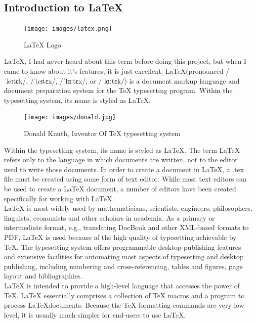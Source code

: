 \subsection{Introduction to \LaTeX}
\begin{figure}[ht]
\centering
\texttt{[image: images/latex.png]}
\caption{\LaTeX{} Logo}
\end{figure}
\hspace{-1.8em} \LaTeX{}, I had never heard about this term before doing this project,
but when I came to know about it's features, it is just excellent. 
\LaTeX (pronounced /ˈleɪtɛk/, /ˈleɪtɛx/, /ˈlɑːtɛx/, or /ˈlɑːtɛk/) is a 
document markup language and document preparation system for the \TeX{} 
typesetting  program. Within the typesetting system, its name is styled 
as \LaTeX.
\begin{figure}[ht]
\centering
\texttt{[image: images/donald.jpg]}
\caption{Donald Knuth, Inventor Of \TeX{} typesetting system}
\end{figure}

\hspace{-1.8em} Within the typesetting system, its name is styled as \LaTeX. The term 
\LaTeX{} refers only to the language in which documents are written, 
not to the editor used to write those documents. In order to create a 
document in \LaTeX, a .tex file must be created using some form of text 
editor. While most text editors can be used to create a \LaTeX{} document, 
a number of editors have been created specifically for working with \LaTeX.\\

\noindent\LaTeX{} is most widely used by mathematicians, scientists, 
engineers, philosophers, linguists, economists and other scholars in 
academia. As a primary or intermediate format, e.g., translating DocBook 
and other XML-based formats to PDF, \LaTeX{} is used because of the 
high quality of typesetting achievable by \TeX. The typesetting system 
offers programmable desktop publishing features and extensive facilities 
for automating most aspects of typesetting and desktop publishing, 
including numbering and cross-referencing, tables and figures, 
page layout and bibliographies.\\

\noindent\LaTeX{} is intended to provide a high-level language that
accesses the power of \TeX. \LaTeX{} essentially comprises a
collection of \TeX{} macros and a program to process \LaTeX documents. 
Because the \TeX{} formatting commands are very low-level, it is usually 
much simpler for end-users to use \LaTeX{}.


